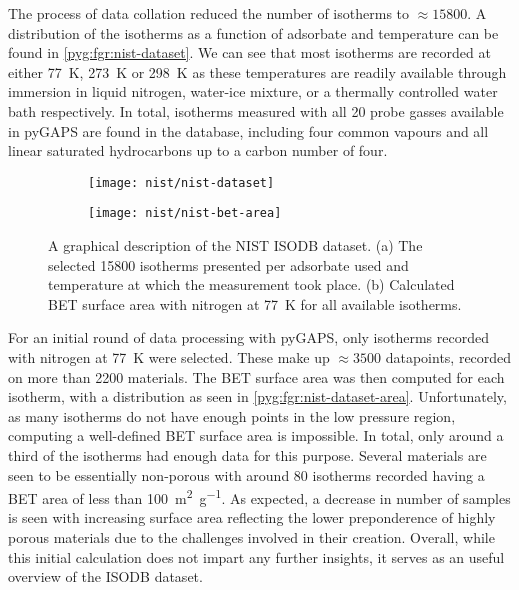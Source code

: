 The process of data collation reduced the number of isotherms
to \(\approx \! 15800\). A distribution of the isotherms as a 
function of adsorbate and temperature can be found 
in \autoref{pyg:fgr:nist-dataset}.
We can see that most isotherms are recorded at either 
\SI{77}{\kelvin}, \SI{273}{\kelvin} or \SI{298}{\kelvin} as 
these temperatures are readily available through immersion
in liquid nitrogen, water-ice mixture, or a thermally controlled
water bath respectively. In total, isotherms measured with all 20 
probe gasses available in pyGAPS are found in the database, 
including four common vapours and all linear saturated hydrocarbons
up to a carbon number of four. 

\begin{figure}[htb]
    \centering

    \begin{subfigure}[b]{0.5\linewidth}
        \texttt{[image: nist/nist-dataset]}%
        \caption{}%
        \label{pyg:fgr:nist-dataset}
    \end{subfigure}%
    \begin{subfigure}[b]{0.45\linewidth}
        \texttt{[image: nist/nist-bet-area]}%
        \caption{}%
        \label{pyg:fgr:nist-dataset-area}
    \end{subfigure}%

    \caption{A graphical description of the NIST ISODB dataset.
    (a) The selected 15800 isotherms presented per adsorbate used
    and temperature at which the measurement took place.
    (b) Calculated BET surface area with nitrogen at \SI{77}{\kelvin}
    for all available isotherms. }%
    \label{pyg:fgr:nist-set}
\end{figure}

For an initial round of data processing with pyGAPS,
only isotherms recorded with nitrogen at \SI{77}{\kelvin}
were selected. These make up \(\approx \! 3500\) datapoints,
recorded on more than 2200 materials. The BET surface area 
was then computed for each isotherm, with a distribution
as seen in \autoref{pyg:fgr:nist-dataset-area}.
Unfortunately, as many isotherms do not have enough points
in the low pressure region, computing a well-defined
BET surface area is impossible. In total, only around a
third of the isotherms had enough data for this purpose.
Several materials are seen to be essentially non-porous
with around 80 isotherms recorded having a BET area of less 
than \SI{100}{\metre^2\per\gram}. As expected, a decrease in 
number of samples is seen with increasing surface area
reflecting the lower preponderence of highly porous 
materials due to the challenges involved in their 
creation. Overall, while this initial calculation does 
not impart any further insights, it serves as an useful overview
of the ISODB dataset.

